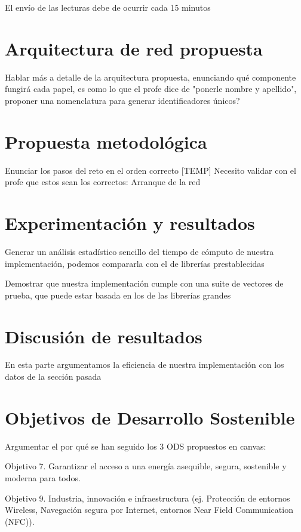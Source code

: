 \documentclass{article}
\begin{document}
            El envío de las lecturas debe de ocurrir cada 15 minutos

    \section{Arquitectura de red propuesta}

        Hablar más a detalle de la arquitectura propuesta, enunciando qué componente fungirá cada papel, es como lo que el profe dice de "ponerle nombre y apellido", proponer una nomenclatura para generar identificadores únicos?

    \section{Propuesta metodológica}

        Enunciar los pasos del reto en el orden correcto
        [TEMP] Necesito validar con el profe que estos sean los correctos:
        Arranque de la red

    \section{Experimentación y resultados}

        Generar un análisis estadístico sencillo del tiempo de cómputo de nuestra implementación, podemos compararla con el de librerías prestablecidas

        Demostrar que nuestra implementación cumple con una suite de vectores de prueba, que puede estar basada en los de las librerías grandes

    \section{Discusión de resultados}

        En esta parte argumentamos la eficiencia de nuestra implementación con los datos de la sección pasada

    \section{Objetivos de Desarrollo Sostenible}

        Argumentar el por qué se han seguido los 3 ODS propuestos en canvas:

        Objetivo 7. Garantizar el acceso a una energía asequible, segura, sostenible y moderna para todos.

        Objetivo 9. Industria, innovación e infraestructura (ej. Protección de entornos Wireless, Navegación segura por Internet, entornos Near Field Communication (NFC)).
\end{document}
